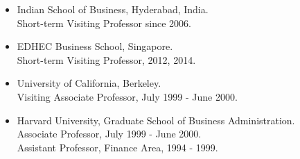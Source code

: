 \documentclass{article}
\begin{document}
\begin{description}
\begin{itemize}
\item Indian School of Business, Hyderabad, India. \\
\hspace*{0.25in} Short-term Visiting Professor since 2006. 

\item EDHEC Business School, Singapore.\\
\hspace*{0.25in} Short-term Visiting Professor, 2012, 2014. 

\item University of California, Berkeley.\\
\hspace*{0.25in}Visiting Associate Professor, July 1999 - June 2000. 


\item Harvard University, Graduate School of Business Administration.\\
\hspace*{0.25in}Associate Professor, July 1999 - June 2000. \\
\hspace*{0.25in}Assistant Professor, Finance Area, 1994 - 1999.



\end{itemize}

\end{description}
\end{document}
